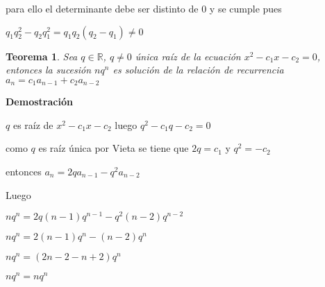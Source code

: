 \documentclass[a4paper,12pt]{report}
\newtheorem*{teo}{Teorema}
\begin{document}
para ello el determinante debe ser distinto de 0 y se cumple pues

$q_1q^2_2-q_2q^2_1=q_1q_2(q_2-q_1)\neq0$




\begin{teo}
 Sea $q\in\mathbb{R}$, $q\neq 0$ única raíz de la ecuación $x^2-c_1x-c_2=0$, entonces la sucesión $nq^n$  es solución de la relación de recurrencia $a_n=c_1a_{n-1}+c_2a_{n-2}$
\end{teo}

\textbf{Demostración}

$q$ es raíz de $x^2-c_1x-c_2$ luego $q^2-c_1q-c_2=0$

como $q$ es raíz única por Vieta se tiene que $2q=c_1$ y $q^2=-c_2$

entonces $a_n=2qa_{n-1}-q^2a_{n-2}$

Luego 

$nq^n=2q(n-1)q^{n-1}-q^2(n-2)q^{n-2}$

$nq^n=2(n-1)q^{n}-(n-2)q^{n}$

$nq^n=(2n-2-n+2)q^{n}$

$nq^n=nq^n$
   
\end{document}
